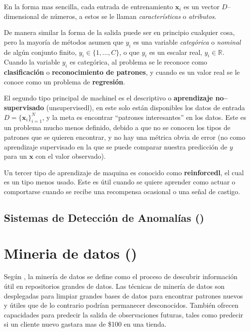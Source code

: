 En la forma mas sencilla, cada entrada de entrenamiento $\mathbf{x}_i$ es un vector $D$--dimensional de números, a estos se le llaman \emph{características} o \emph{atributos}.

De manera similar la forma de la salida puede ser en principio cualquier cosa, pero la mayoría de métodos asumen que $y_i$ es una variable \emph{categórica} o \emph{nominal} de algún conjunto finito, $y_i \in \{1,\ldots,C\}$, o que $y_i$ es un escalar real, $y_i \in \mathbb{R}$. Cuando la variable $y_i$ es categórica, al problema se le reconoce como \textbf{clasificación} o \textbf{reconocimiento de patrones}, y cuando es un valor real se le conoce como un problema de \textbf{regresión}.

El segundo tipo principal de \gls{machinel} es el descriptivo o \textbf{aprendizaje no--supervisado} (\gls{unsupervisedl}), en este solo están disponibles los datos de entrada $D = \{\mathbf{x}_i\}_{i=1}^{N}$, y la meta es encontrar ``patrones interesantes'' en los datos. Este es un problema mucho menos definido, debido a que no se conocen los tipos de patrones que se quieren encontrar, y no hay una métrica obvia de error (no como aprendizaje supervisado en la que se puede comparar nuestra predicción de $y$ para un $\mathbf{x}$ con el valor observado).

Un tercer tipo de aprendizaje de maquina es conocido como \textbf{\gls{reinforcedl}}, el cual es un tipo menos usado. Este es útil cuando se quiere aprender como actuar o comportarse cuando se recibe una recompensa ocasional o una señal de castigo.

\subsection{Sistemas de Detección de Anomalías ()}


\section{Mineria de datos ()} \label{sec:datamining}
Según \cite{tan2005introduction}, la minería de datos se define como el proceso de descubrir información útil en repositorios grandes de datos. Las técnicas de minería de datos son desplegadas para limpiar grandes bases de datos para encontrar patrones nuevos y útiles que de lo contrario podrían permanecer desconocidos. También ofrecen capacidades para predecir la salida de observaciones futuras, tales como predecir si un cliente nuevo gastara mas de \$100 en una tienda.

